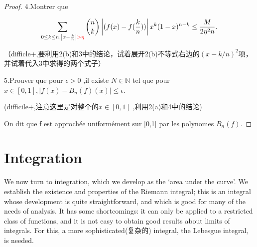 \documentclass[12pt]{book}
\theoremstyle{definition}\newtheorem{dfn}{Définition}[chapter]
\theoremstyle{plain}\newtheorem{thm}{Théorème}[chapter]
\theoremstyle{plain}\newtheorem{prp}{Proposition}[chapter]
\theoremstyle{plain}\newtheorem{lem}{\bf Lemme}[chapter]
\theoremstyle{plain}\newtheorem{axm}{\bf Axiome}[chapter]
\theoremstyle{plain}\newtheorem{lmm}{\bf Lemme}[chapter]
\theoremstyle{plain}\newtheorem{cor}{\bf Corollaire}[chapter]
\theoremstyle{remark}\newtheorem{rem}{Remarque}[chapter]
\begin{document}
\begin{proof}
4.Montrer que 

$$\sum_{0\le k\le n, \left | x-\frac{k}{n} \right | \color{red}{>}\eta}\binom{n}{k}\left|(f(x)-f(\frac{k}{n}))\right|x^k(1-x)^{n-k}\le\frac{M}{2\eta^2 n}.$$

（difficle+,要利用2(b)和3中的结论，试着展开2(b)不等式右边的$(x-k/n)^2$项，并试着代入3中求得的两个式子）

5.Prouver que pour $\epsilon>0$ ,il existe $N\in \mathbb N$ tel que pour $x\in [0,1],\left|f(x)-B_{n}(f)(x)\right|\le \epsilon.$

(difficile+,注意这里是对整个的$x\in[0,1]$ ,利用2(a)和4中的结论)

On dit que f est approchée uniformément sur [0,1] par les polynomes $B_{n}(f)$.
\end{proof}





\chapter{Integration}
We now turn to integration, which we develop as the ‘area under the curve’. We establish the existence and properties of the Riemann integral; this is an integral whose development is quite straightforward, and which is good for many of the needs of analysis. It has some shortcomings: it can only be applied to a restricted class of functions, and it is not easy to obtain good results about limits of integrals. For this, a more sophisticated(复杂的) integral, the Lebesgue integral, is needed.
\end{document}
